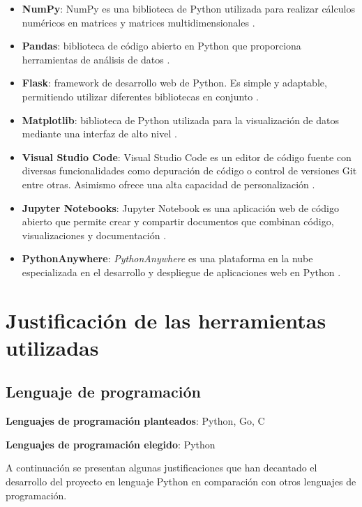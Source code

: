 \begin{itemize}
\item \textbf{NumPy}: NumPy es una biblioteca de Python utilizada para realizar cálculos numéricos en matrices y matrices multidimensionales \cite{NumPy}. 

\item \textbf{Pandas}: biblioteca de código abierto en Python que proporciona herramientas de análisis de datos \cite{pandas}. 

\item \textbf{Flask}: framework de desarrollo web de Python. Es simple y adaptable, permitiendo utilizar diferentes bibliotecas en conjunto \cite{Flask}. 

\item \textbf{Matplotlib}: biblioteca de Python utilizada para la visualización de datos mediante una interfaz de alto nivel \cite{matplotlib}. 

\item \textbf{Visual Studio Code}: Visual Studio Code es un editor de código fuente con diversas funcionalidades como depuración de código o control de versiones Git entre otras. Asimismo ofrece una alta capacidad de personalización \cite{Microsoft_2021}. 

\item \textbf{Jupyter Notebooks}: Jupyter Notebook es una aplicación web de código abierto que permite crear y compartir documentos que combinan código, visualizaciones y documentación \cite{Jupyter}. 

\item \textbf{PythonAnywhere}: \textit{PythonAnywhere} es una plataforma en la nube especializada en el desarrollo y despliegue de aplicaciones web en Python \cite{LLP}.
\end{itemize}

\section{Justificación de las herramientas utilizadas}

\subsection{Lenguaje de programación}
\textbf{Lenguajes de programación planteados}: Python, Go, C

\textbf{Lenguajes de programación elegido}: Python

A continuación se presentan algunas justificaciones que han decantado el desarrollo del proyecto en lenguaje Python en comparación con otros lenguajes de programación.

